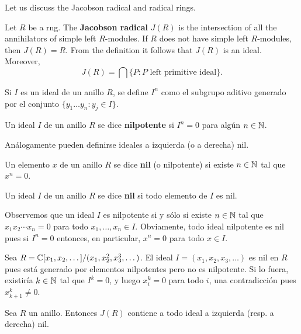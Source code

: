 Let us discuss the Jacobson radical and radical rings. 

Let $R$ be a rng. The \textbf{Jacobson radical} $J(R)$
is the intersection of all the annihilators of simple left $R$-modules. If $R$ does not
have simple left $R$-modules, then $J(R)=R$. From the definition it follows
that $J(R)$ is an ideal. Moreover, 
	\[
		J(R)=\bigcap\{P:\text{$P$ left primitive ideal}\}.
	\]

Si $I$ es un ideal de un anillo $R$, se define $I^n$ como el subgrupo aditivo
generado por el conjunto $\{y_1\dots y_n:y_j\in I\}$. 

\begin{definition}
	Un ideal $I$ de un anillo $R$ se dice \textbf{nilpotente} si $I^n=0$ para
	algún $n\in\mathbb{N}$.
\end{definition}

Análogamente pueden definirse ideales a izquierda (o a derecha) nil.

\begin{definition}
	Un elemento $x$ de un anillo $R$ se dice \textbf{nil} (o nilpotente) si
	existe $n\in\mathbb{N}$ tal que $x^n=0$. 
\end{definition}

\begin{definition}
	Un ideal $I$ de un anillo $R$ se dice \textbf{nil} si todo elemento de $I$
	es nil.
\end{definition}

Observemos que un ideal $I$ es nilpotente si y sólo si existe $n\in\mathbb{N}$ tal que
$x_1x_2\cdots x_n=0$ para todo $x_1,\dots,x_n\in I$.  Obviamente, todo ideal
nilpotente es nil pues si $I^n=0$ entonces, en particular, $x^n=0$ para todo
$x\in I$.

\begin{example}
	Sea $R=\mathbb{C}[x_1,x_2,\dots]/(x_1,x_2^2,x_3^3,\dots)$. El ideal
	$I=(x_1,x_2,x_3,\dots)$ es nil en $R$ pues está generado por elementos
	nilpotentes pero no es nilpotente. Si lo fuera, existiría $k\in\mathbb{N}$ tal que
	$I^k=0$, y luego $x_i^k=0$ para todo $i$, una contradicción pues
	$x_{k+1}^k\ne0$. 	
\end{example}

\begin{proposition}
	\label{pro:nilJ}
	Sea $R$ un anillo. Entonces $J(R)$ contiene a todo ideal a izquierda (resp.
	a derecha) nil.
\end{proposition}

